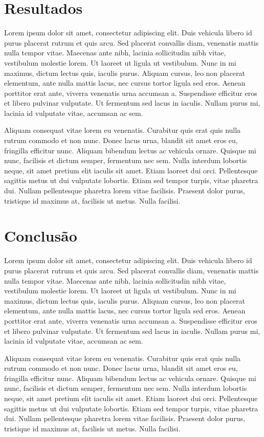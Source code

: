 \documentclass[a4paper,10pt]{article}
\begin{document}
\section{Resultados}

 Lorem ipsum dolor sit amet, consectetur adipiscing elit. Duis vehicula libero id purus placerat rutrum et quis arcu. Sed placerat convallis diam, venenatis mattis nulla tempor vitae. Maecenas ante nibh, lacinia sollicitudin nibh vitae, vestibulum molestie lorem. Ut laoreet ut ligula ut vestibulum. Nunc in mi maximus, dictum lectus quis, iaculis purus. Aliquam cursus, leo non placerat elementum, ante nulla mattis lacus, nec cursus tortor ligula sed eros. Aenean porttitor erat ante, viverra venenatis urna accumsan a. Suspendisse efficitur eros et libero pulvinar vulputate. Ut fermentum sed lacus in iaculis. Nullam purus mi, lacinia id vulputate vitae, accumsan ac sem.

Aliquam consequat vitae lorem eu venenatis. Curabitur quis erat quis nulla rutrum commodo et non nunc. Donec lacus urna, blandit sit amet eros eu, fringilla efficitur nunc. Aliquam bibendum lectus ac vehicula ornare. Quisque mi nunc, facilisis et dictum semper, fermentum nec sem. Nulla interdum lobortis neque, sit amet pretium elit iaculis sit amet. Etiam laoreet dui orci. Pellentesque sagittis metus ut dui vulputate lobortis. Etiam sed tempor turpis, vitae pharetra dui. Nullam pellentesque pharetra lorem vitae facilisis. Praesent dolor purus, tristique id maximus at, facilisis ut metus. Nulla facilisi. 

\section{Conclusão}

 Lorem ipsum dolor sit amet, consectetur adipiscing elit. Duis vehicula libero id purus placerat rutrum et quis arcu. Sed placerat convallis diam, venenatis mattis nulla tempor vitae. Maecenas ante nibh, lacinia sollicitudin nibh vitae, vestibulum molestie lorem. Ut laoreet ut ligula ut vestibulum. Nunc in mi maximus, dictum lectus quis, iaculis purus. Aliquam cursus, leo non placerat elementum, ante nulla mattis lacus, nec cursus tortor ligula sed eros. Aenean porttitor erat ante, viverra venenatis urna accumsan a. Suspendisse efficitur eros et libero pulvinar vulputate. Ut fermentum sed lacus in iaculis. Nullam purus mi, lacinia id vulputate vitae, accumsan ac sem.

Aliquam consequat vitae lorem eu venenatis. Curabitur quis erat quis nulla rutrum commodo et non nunc. Donec lacus urna, blandit sit amet eros eu, fringilla efficitur nunc. Aliquam bibendum lectus ac vehicula ornare. Quisque mi nunc, facilisis et dictum semper, fermentum nec sem. Nulla interdum lobortis neque, sit amet pretium elit iaculis sit amet. Etiam laoreet dui orci. Pellentesque sagittis metus ut dui vulputate lobortis. Etiam sed tempor turpis, vitae pharetra dui. Nullam pellentesque pharetra lorem vitae facilisis. Praesent dolor purus, tristique id maximus at, facilisis ut metus. Nulla facilisi. 

\medskip


\end{document}
